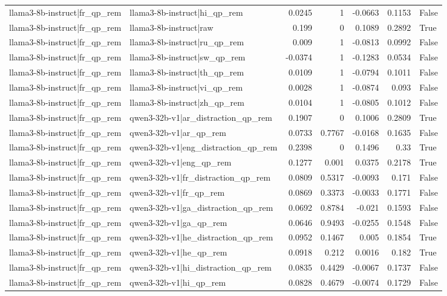 \begin{table}
\begin{tabular}{l l r r r r l}
llama3-8b-instruct|fr_qp_rem & llama3-8b-instruct|hi_qp_rem & 0.0245 & 1 & -0.0663 & 0.1153 & False \\
llama3-8b-instruct|fr_qp_rem & llama3-8b-instruct|raw & 0.199 & 0 & 0.1089 & 0.2892 & True \\
llama3-8b-instruct|fr_qp_rem & llama3-8b-instruct|ru_qp_rem & 0.009 & 1 & -0.0813 & 0.0992 & False \\
llama3-8b-instruct|fr_qp_rem & llama3-8b-instruct|sw_qp_rem & -0.0374 & 1 & -0.1283 & 0.0534 & False \\
llama3-8b-instruct|fr_qp_rem & llama3-8b-instruct|th_qp_rem & 0.0109 & 1 & -0.0794 & 0.1011 & False \\
llama3-8b-instruct|fr_qp_rem & llama3-8b-instruct|vi_qp_rem & 0.0028 & 1 & -0.0874 & 0.093 & False \\
llama3-8b-instruct|fr_qp_rem & llama3-8b-instruct|zh_qp_rem & 0.0104 & 1 & -0.0805 & 0.1012 & False \\
llama3-8b-instruct|fr_qp_rem & qwen3-32b-v1|ar_distraction_qp_rem & 0.1907 & 0 & 0.1006 & 0.2809 & True \\
llama3-8b-instruct|fr_qp_rem & qwen3-32b-v1|ar_qp_rem & 0.0733 & 0.7767 & -0.0168 & 0.1635 & False \\
llama3-8b-instruct|fr_qp_rem & qwen3-32b-v1|eng_distraction_qp_rem & 0.2398 & 0 & 0.1496 & 0.33 & True \\
llama3-8b-instruct|fr_qp_rem & qwen3-32b-v1|eng_qp_rem & 0.1277 & 0.001 & 0.0375 & 0.2178 & True \\
llama3-8b-instruct|fr_qp_rem & qwen3-32b-v1|fr_distraction_qp_rem & 0.0809 & 0.5317 & -0.0093 & 0.171 & False \\
llama3-8b-instruct|fr_qp_rem & qwen3-32b-v1|fr_qp_rem & 0.0869 & 0.3373 & -0.0033 & 0.1771 & False \\
llama3-8b-instruct|fr_qp_rem & qwen3-32b-v1|ga_distraction_qp_rem & 0.0692 & 0.8784 & -0.021 & 0.1593 & False \\
llama3-8b-instruct|fr_qp_rem & qwen3-32b-v1|ga_qp_rem & 0.0646 & 0.9493 & -0.0255 & 0.1548 & False \\
llama3-8b-instruct|fr_qp_rem & qwen3-32b-v1|he_distraction_qp_rem & 0.0952 & 0.1467 & 0.005 & 0.1854 & True \\
llama3-8b-instruct|fr_qp_rem & qwen3-32b-v1|he_qp_rem & 0.0918 & 0.212 & 0.0016 & 0.182 & True \\
llama3-8b-instruct|fr_qp_rem & qwen3-32b-v1|hi_distraction_qp_rem & 0.0835 & 0.4429 & -0.0067 & 0.1737 & False \\
llama3-8b-instruct|fr_qp_rem & qwen3-32b-v1|hi_qp_rem & 0.0828 & 0.4679 & -0.0074 & 0.1729 & False \\

\end{tabular}
\end{table}
